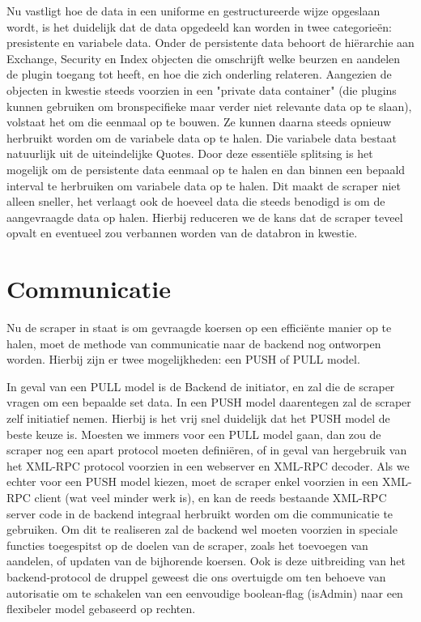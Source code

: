 Nu vastligt hoe de data in een uniforme en gestructureerde wijze opgeslaan wordt, is het duidelijk dat de data opgedeeld kan worden in twee categorie\"en: presistente en variabele data.
Onder de persistente data behoort de hi\"erarchie aan Exchange, Security en Index objecten die omschrijft welke beurzen en aandelen de plugin toegang tot heeft, en hoe die zich onderling relateren. Aangezien de objecten in kwestie steeds voorzien in een "private data container" (die plugins kunnen gebruiken om bronspecifieke maar verder niet relevante data op te slaan), volstaat het om die eenmaal op te bouwen. Ze kunnen daarna steeds opnieuw herbruikt worden om de variabele data op te halen. Die variabele data bestaat natuurlijk uit de uiteindelijke Quotes.
Door deze essenti\"ele splitsing is het mogelijk om de persistente data eenmaal op te halen en dan binnen een bepaald interval te herbruiken om variabele data op te halen. Dit maakt de scraper niet alleen sneller, het verlaagt ook de hoeveel data die steeds benodigd is om de aangevraagde data op halen. Hierbij reduceren we de kans dat de scraper teveel opvalt en eventueel zou verbannen worden van de databron in kwestie.

\section{Communicatie}

Nu de scraper in staat is om gevraagde koersen op een effici\"ente manier op te halen, moet de methode van communicatie naar de backend nog ontworpen worden. Hierbij zijn er twee mogelijkheden: een PUSH of PULL model.

In geval van een PULL model is de Backend de initiator, en zal die de scraper vragen om een bepaalde set data. In een PUSH model daarentegen zal de scraper zelf initiatief nemen. Hierbij is het vrij snel duidelijk dat het PUSH model de beste keuze is. Moesten we immers voor een PULL model gaan, dan zou de scraper nog een apart protocol moeten defini\"eren, of in geval van hergebruik van het XML-RPC protocol voorzien in een webserver en XML-RPC decoder. Als we echter voor een PUSH model kiezen, moet de scraper enkel voorzien in een XML-RPC client (wat veel minder werk is), en kan de reeds bestaande XML-RPC server code in de backend integraal herbruikt worden om die communicatie te gebruiken.
Om dit te realiseren zal de backend wel moeten voorzien in speciale functies toegespitst op de doelen van de scraper, zoals het toevoegen van aandelen, of updaten van de bijhorende koersen. Ook is deze uitbreiding van het backend-protocol de druppel geweest die ons overtuigde om ten behoeve van autorisatie om te schakelen van een eenvoudige boolean-flag (isAdmin) naar een flexibeler model gebaseerd op rechten.

